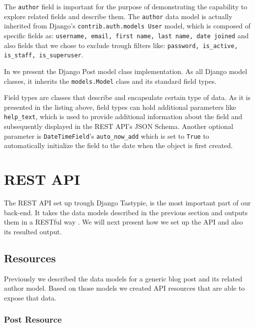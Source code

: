The \texttt{author} field is important for the purpose of demonstrating the capability to explore related fields and describe them. The \texttt{author} data model is actually inherited from Django's \texttt{contrib.auth.models User} model, which is composed of specific fields as: \texttt{username, email, first name, last name, date joined} and also fields that we chose to exclude trough filters like: \texttt{password, is\_active, is\_staff, is\_superuser}.

In  we present the Django Post model class implementation. As all Django model classes, it inherits the \texttt{models.Model} class and its standard field types.



Field types are classes that describe and encapsulate certain type of data. As it is presented in the listing above, field types can hold additional parameters like \texttt{help\_text}, which is used to provide additional information about the field and subsequently displayed in the REST API's JSON Schema. Another optional parameter is \texttt{DateTimeField}'s \texttt{auto\_now\_add} which is set to \texttt{True} to automatically initialize the field to the date when the object is first created.
		

\section{REST API}
\label{sec:api}

The REST API set up trough Django Tastypie, is the most important part of our back-end. It takes the data models described in the previous section and outputs them in a RESTful way \cite{book1}. We will next present how we set up the API and also its resulted output.

\subsection{Resources}
\label{sub-sec:resources}

Previously we described the data models for a generic blog post and its related author model. Based on those models we created API resources that are able to expose that data.

\subsubsection{Post Resource}
\label{sub-sub-sec:post-resource}


